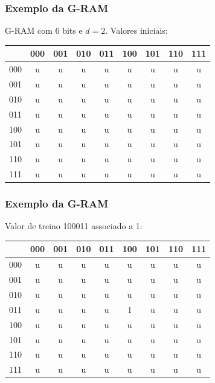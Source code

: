 \documentclass{beamer}
\begin{document}
\begin{frame}
    \frametitle{Exemplo da G-RAM}
    G-RAM com 6 bits e $d = 2$. Valores iniciais:

    \begin{table}
        \centering
        \begin{tabular}{|c|c|c|c|c|c|c|c|c|}
            \hline
                & 000 & 001 & 010 & 011 & 100 & 101 & 110 & 111\\
            \hline
            000 &  u  &  u  &  u  &  u  &  u  &  u  &  u  &  u \\
            \hline
            001 &  u  &  u  &  u  &  u  &  u  &  u  &  u  &  u \\
            \hline
            010 &  u  &  u  &  u  &  u  &  u  &  u  &  u  &  u \\
            \hline
            011 &  u  &  u  &  u  &  u  &  u  &  u  &  u  &  u \\
            \hline
            100 &  u  &  u  &  u  &  u  &  u  &  u  &  u  &  u \\
            \hline
            101 &  u  &  u  &  u  &  u  &  u  &  u  &  u  &  u \\
            \hline
            110 &  u  &  u  &  u  &  u  &  u  &  u  &  u  &  u \\
            \hline
            111 &  u  &  u  &  u  &  u  &  u  &  u  &  u  &  u \\
            \hline

        \end{tabular}
    \end{table}
\end{frame}
\begin{frame}
    \frametitle{Exemplo da G-RAM}
    Valor de treino 100011 associado a 1:

    \begin{table}
        \centering
        \begin{tabular}{|c|c|c|c|c|c|c|c|c|}
            \hline
                & 000 & 001 & 010 & 011 & 100 & 101 & 110 & 111\\
            \hline
            000 &  u  &  u  &  u  &  u  &  u  &  u  &  u  &  u \\
            \hline
            001 &  u  &  u  &  u  &  u  &  u  &  u  &  u  &  u \\
            \hline
            010 &  u  &  u  &  u  &  u  &  u  &  u  &  u  &  u \\
            \hline
            011 &  u  &  u  &  u  &  u  &  \alert 1  &  u  &  u  &  u \\
            \hline
            100 &  u  &  u  &  u  &  u  &  u  &  u  &  u  &  u \\
            \hline
            101 &  u  &  u  &  u  &  u  &  u  &  u  &  u  &  u \\
            \hline
            110 &  u  &  u  &  u  &  u  &  u  &  u  &  u  &  u \\
            \hline
            111 &  u  &  u  &  u  &  u  &  u  &  u  &  u  &  u \\
            \hline

        \end{tabular}
    \end{table}
\end{frame}
\end{document}
